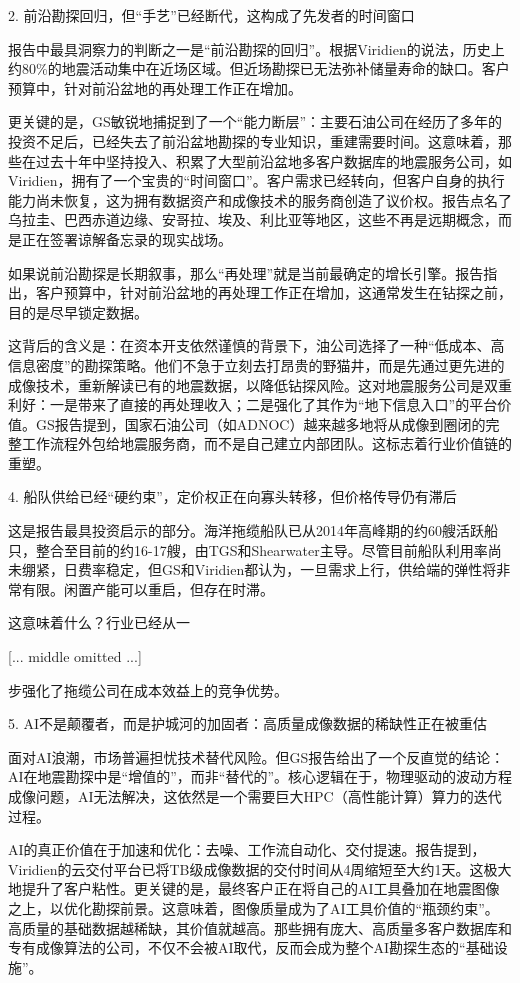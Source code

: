\documentclass[11pt]{ctexart}
\begin{document}
2. 前沿勘探回归，但“手艺”已经断代，这构成了先发者的时间窗口

报告中最具洞察力的判断之一是“前沿勘探的回归”。根据Viridien的说法，历史上约80\%的地震活动集中在近场区域。但近场勘探已无法弥补储量寿命的缺口。客户预算中，针对前沿盆地的再处理工作正在增加。

更关键的是，GS敏锐地捕捉到了一个“能力断层”：主要石油公司在经历了多年的投资不足后，已经失去了前沿盆地勘探的专业知识，重建需要时间。这意味着，那些在过去十年中坚持投入、积累了大型前沿盆地多客户数据库的地震服务公司，如Viridien，拥有了一个宝贵的“时间窗口”。客户需求已经转向，但客户自身的执行能力尚未恢复，这为拥有数据资产和成像技术的服务商创造了议价权。报告点名了乌拉圭、巴西赤道边缘、安哥拉、埃及、利比亚等地区，这些不再是远期概念，而是正在签署谅解备忘录的现实战场。

如果说前沿勘探是长期叙事，那么“再处理”就是当前最确定的增长引擎。报告指出，客户预算中，针对前沿盆地的再处理工作正在增加，这通常发生在钻探之前，目的是尽早锁定数据。

这背后的含义是：在资本开支依然谨慎的背景下，油公司选择了一种“低成本、高信息密度”的勘探策略。他们不急于立刻去打昂贵的野猫井，而是先通过更先进的成像技术，重新解读已有的地震数据，以降低钻探风险。这对地震服务公司是双重利好：一是带来了直接的再处理收入；二是强化了其作为“地下信息入口”的平台价值。GS报告提到，国家石油公司（如ADNOC）越来越多地将从成像到圈闭的完整工作流程外包给地震服务商，而不是自己建立内部团队。这标志着行业价值链的重塑。

4. 船队供给已经“硬约束”，定价权正在向寡头转移，但价格传导仍有滞后

这是报告最具投资启示的部分。海洋拖缆船队已从2014年高峰期的约60艘活跃船只，整合至目前的约16-17艘，由TGS和Shearwater主导。尽管目前船队利用率尚未绷紧，日费率稳定，但GS和Viridien都认为，一旦需求上行，供给端的弹性将非常有限。闲置产能可以重启，但存在时滞。

这意味着什么？行业已经从一

[... middle omitted ...]

步强化了拖缆公司在成本效益上的竞争优势。

5. AI不是颠覆者，而是护城河的加固者：高质量成像数据的稀缺性正在被重估

面对AI浪潮，市场普遍担忧技术替代风险。但GS报告给出了一个反直觉的结论：AI在地震勘探中是“增值的”，而非“替代的”。核心逻辑在于，物理驱动的波动方程成像问题，AI无法解决，这依然是一个需要巨大HPC（高性能计算）算力的迭代过程。

AI的真正价值在于加速和优化：去噪、工作流自动化、交付提速。报告提到，Viridien的云交付平台已将TB级成像数据的交付时间从4周缩短至大约1天。这极大地提升了客户粘性。更关键的是，最终客户正在将自己的AI工具叠加在地震图像之上，以优化勘探前景。这意味着，图像质量成为了AI工具价值的“瓶颈约束”。高质量的基础数据越稀缺，其价值就越高。那些拥有庞大、高质量多客户数据库和专有成像算法的公司，不仅不会被AI取代，反而会成为整个AI勘探生态的“基础设施”。
\end{document}
